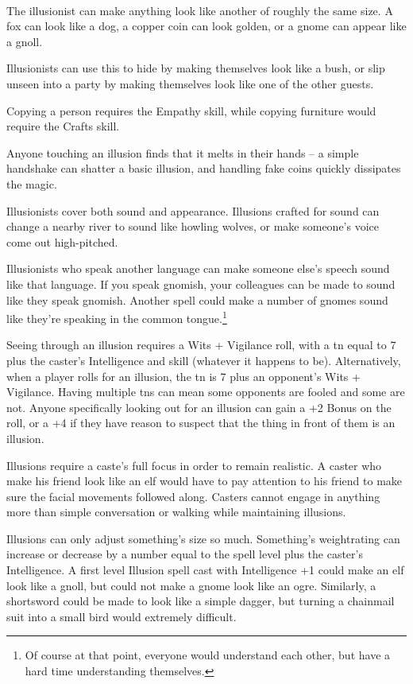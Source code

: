\begin{multicols}{2}
\\
The illusionist can make anything look like another of roughly the same size.  A fox can look like a dog, a copper coin can look golden, or a gnome can appear like a gnoll.

Illusionists can use this to hide by making themselves look like a bush, or slip unseen into a party by making themselves look like one of the other guests.

Copying a person requires the Empathy skill, while copying furniture would require the Crafts skill.

Anyone touching an illusion finds that it melts in their hands -- a simple handshake can shatter a basic illusion, and handling fake coins quickly dissipates the magic.

Illusionists cover both sound and appearance.  Illusions crafted for sound can change a nearby river to sound like howling wolves, or make someone's voice come out high-pitched.

Illusionists who speak another language can make someone else's speech sound like that language.
If you speak gnomish, your colleagues can be made to sound like they speak gnomish.
Another spell could make a number of gnomes sound like they're speaking in the common tongue.\footnote{Of course at that point, everyone would understand each other, but have a hard time understanding themselves.}

Seeing through an illusion requires a Wits + Vigilance roll, with a \gls{tn} equal to 7 plus the caster's Intelligence and skill (whatever it happens to be).  Alternatively, when a player rolls for an illusion, the \gls{tn} is 7 plus an opponent's Wits + Vigilance.  Having multiple \glspl{tn} can mean some opponents are fooled and some are not.  Anyone specifically looking out for an illusion can gain a +2 Bonus on the roll, or a +4 if they have reason to suspect that the thing in front of them is an illusion.

Illusions require a caste's full focus in order to remain realistic.  A caster who make his friend look like an elf would have to pay attention to his friend to make sure the facial movements followed along.  Casters cannot engage in anything more than simple conversation or walking while maintaining illusions.

Illusions can only adjust something's size so much.
Something's \gls{weightrating} can increase or decrease by a number equal to the spell level plus the caster's Intelligence.
A first level Illusion spell cast with Intelligence +1 could make an elf look like a gnoll, but could not make a gnome look like an ogre.
Similarly, a shortsword could be made to look like a simple dagger, but turning a chainmail suit into a small bird would extremely difficult.


\end{multicols}
